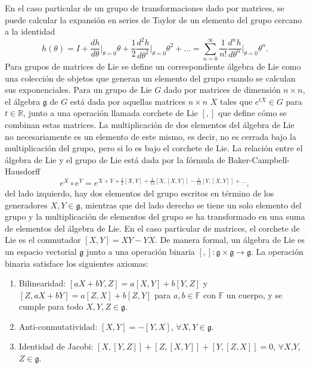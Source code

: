 En el caso particular de un grupo de transformaciones dado por matrices, se puede calcular la expansión en series de Taylor de un elemento del grupo cercano a la identidad
\begin{equation*}
  h(\theta) = I + \frac{dh}{d\theta}\bigg|_{\theta=0}\theta + \frac{1}{2}\frac{d^2h}{d\theta^2}\bigg|_{\theta=0}\theta^2 + \dots = \sum_{n=0}^{\infty} \frac{1}{n!}\frac{d^n h}{d\theta^n}\bigg|_{\theta=0}\theta^n.
\end{equation*}
Para grupos de matrices de Lie se define un correspondiente álgebra de Lie como una colección de objetos que generan un elemento del grupo cuando se calculan sus exponenciales. Para un grupo de Lie $G$ dado por matrices de dimensión $n\times n$, el álgebra $\mathfrak{g}$ de $G$ está dada por aquellas matrices $n\times n$ $X$ tales que $e^{tX}\in G$ para $t\in \mathbb{R}$, junto a una operación llamada corchete de Lie $[,]$ que define cómo se combinan estas matrices. La multiplicación de dos elementos del álgebra de Lie no necesariamente es un elemento de este mismo, es decir, no es cerrada bajo la multiplicación del grupo, pero si lo es bajo el corchete de Lie. La relación entre el álgebra de Lie y el grupo de Lie está dada por la fórmula de Baker-Campbell-Hausdorff
\begin{equation*}
  e^X \circ e^Y = e^{X+Y+\frac{1}{2}[X,Y] + \frac{1}{12}[X,[X,Y]] - \frac{1}{12}[Y,[X,Y]] + \dots},
\end{equation*}
del lado izquierdo, hay dos elementos del grupo escritos en término de los generadores $X,Y\in \mathfrak{g}$, mientras que del lado derecho se tiene un solo elemento del grupo y la multiplicación de elementos del grupo se ha transformado en una suma de elementos del álgebra de Lie. En el caso particular de matrices, el corchete de Lie es el conmutador $[X,Y] = XY-YX$.
De manera formal, un álgebra de Lie es un espacio vectorial $\mathfrak{g}$ junto a una operación binaria $[,]:\mathfrak{g}\times \mathfrak{g} \to \mathfrak{g}$. La operación binaria satisface los siguientes axiomas:
\begin{enumerate}
  \item Bilinearidad: $[aX + bY, Z] = a[X,Y] + b[Y, Z]$ y $[Z, aX + bY] = a[Z,X] + b[Z,Y]$ para $a,b\in \mathbb{F}$ con $\mathbb{F}$ un cuerpo, y se cumple para todo $X,Y,Z\in \mathfrak{g}$.
  \item Anti-conmutatividad: $[X,Y] = -[Y,X]$, $\forall X, Y \in \mathfrak{g}$.
  \item Identidad de Jacobi: $[X, [Y,Z]] + [Z,[X,Y]] + [Y,[Z,X]] = 0$, $\forall X$,$Y$,$Z\in \mathfrak{g}$.
\end{enumerate}
